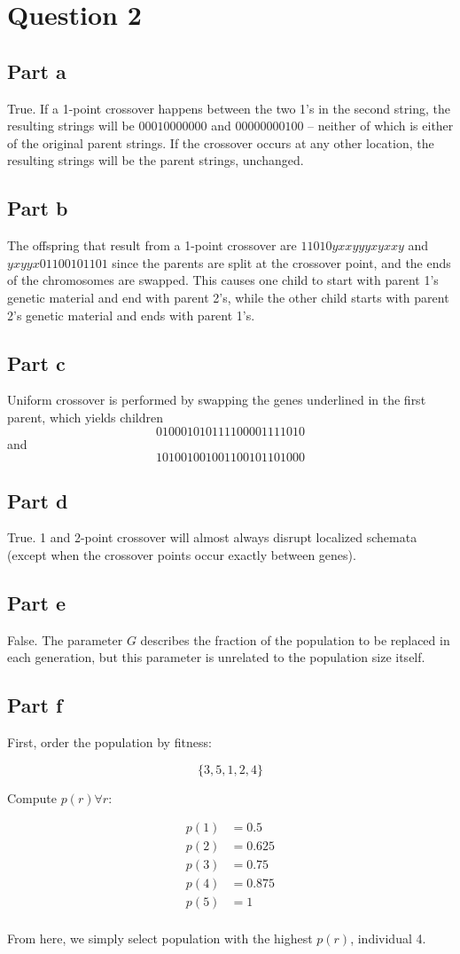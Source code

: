 \documentclass[a4paper]{article}
\begin{document}
\section{Question 2}
\subsection{Part a}
True. If a 1-point crossover happens between the two 1's in the second string,
the resulting strings will be $00010000000$ and $00000000100$ -- neither of
which is either of the original parent strings. If the crossover occurs at any
other location, the resulting strings will be the parent strings, unchanged.

\subsection{Part b}
The offspring that result from a 1-point crossover are $11010yxxyyyxyxxy$ and
$yxyyx01100101101$ since the parents are split at the crossover point, and the
ends of the chromosomes are swapped.  This causes one child to start with
parent 1's genetic material and end with parent 2's, while the other child
starts with parent 2's genetic material and ends with parent 1's.

\subsection{Part c}
Uniform crossover is performed by swapping the genes underlined in the first
parent, which yields children $$01000101 01111000 01111010$$ and $$10100100
10011001 01101000$$

\subsection{Part d}
True. 1 and 2-point crossover will almost always disrupt localized schemata
(except when the crossover points occur exactly between genes).

\subsection{Part e}
False. The parameter $G$ describes the fraction of the population to be replaced
in each generation, but this parameter is unrelated to the population size
itself.

\subsection{Part f}
First, order the population by fitness:

$$\{3, 5, 1, 2, 4\}$$

Compute $p(r) \forall r$:

\begin{align*}
    p(1) &= 0.5 \\
    p(2) &= 0.625 \\
    p(3) &= 0.75 \\
    p(4) &= 0.875 \\
    p(5) &= 1 \\
\end{align*}

From here, we simply select population with the highest $p(r)$, individual 4.
\end{document}
